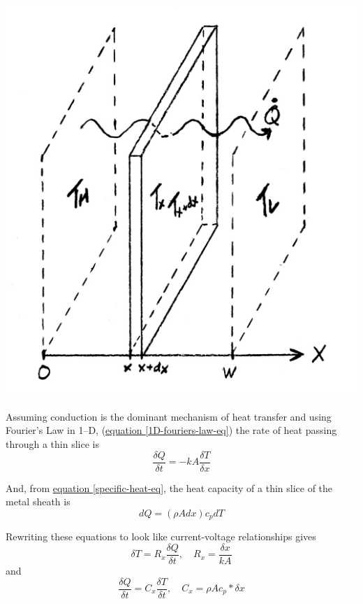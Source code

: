 \documentclass[10pt, twocolumn]{article}
\begin{document}
\begin{center}
\includegraphics[width=0.85\columnwidth]{Figures/unidirectional-conduction.pdf}
\label{unidirectional-conduction}
\end{center}

Assuming conduction is the dominant mechanism of heat transfer
and using Fourier's Law in 1--D,
(\hyperref[1D-fouriers-law-eq]{equation \ref{1D-fouriers-law-eq}})
the rate of heat passing through a thin slice is
\begin{equation*}
\frac{\delta Q}{\delta t}=-kA\frac{\delta T}{\delta x}
\end{equation*} 
 
And, from \hyperref[specific-heat-eq]{equation \ref{specific-heat-eq}},
the heat capacity of a thin slice of the metal sheath is
\begin{equation*}
dQ=(\rho A dx)c_{p}dT
\end{equation*}

Rewriting these equations to look like current-voltage relationships gives
\begin{equation}
\delta T=R_{x}\frac{\delta Q}{\delta t},
\quad R_{x}=\frac{\delta x}{kA}
\label{differential-resistance-eq}
\end{equation}
and
\begin{equation}
\frac{\delta Q}{\delta t}=C_{x}\frac{\delta T}{\delta t},
\quad C_{x}=\rho A c_{p} * \delta x
\label{differential-capacitance-eq}
\end{equation}
\end{document}
